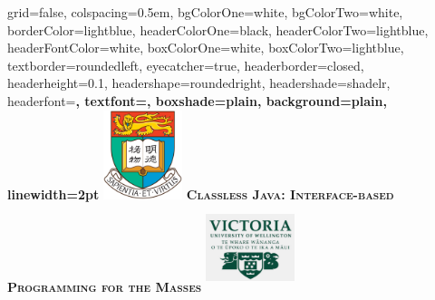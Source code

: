 \documentclass[portrait,final,a0paper,fontscale=0.277]{baposter}
\begin{document}
\begin{poster}%
  {
  grid=false,
  colspacing=0.5em,
  bgColorOne=white,
  bgColorTwo=white,
  borderColor=lightblue,
  headerColorOne=black,
  headerColorTwo=lightblue,
  headerFontColor=white,
  boxColorOne=white,
  boxColorTwo=lightblue,
  textborder=roundedleft,
  eyecatcher=true,
  headerborder=closed,
  headerheight=0.1\textheight,
  headershape=roundedright,
  headershade=shadelr,
  headerfont=\Large\bf\textsc, %
  textfont={\setlength{\parindent}{1.5em}},
  boxshade=plain,
  background=plain,
  linewidth=2pt
  }
  {\includegraphics[height=7em]{pdfs/hku.png}}
  {\bf\textsc{Classless Java: Interface-based Programming for the Masses}\vspace{0.1em}}
  {}
  {%
    \includegraphics[width=7em,height=7em]{pdfs/vuw.png}
  }




    \newcommand{\colouredcircle}{%
      \tikz{\useasboundingbox (-0.2em,-0.32em) rectangle(0.2em,0.32em); \draw[draw=black,fill=lightblue,line width=0.03em] (0,0) circle(0.18em);}}


\end{poster}
\end{document}
